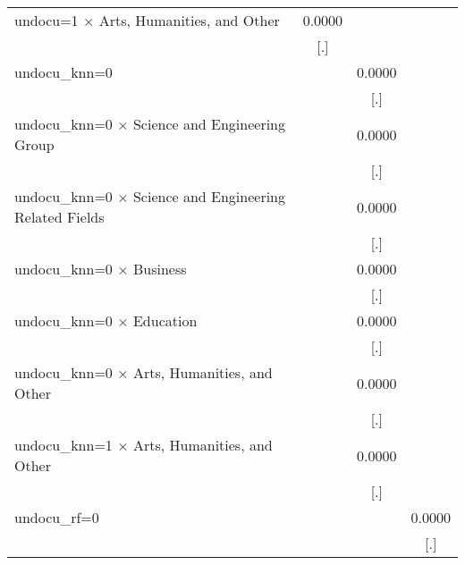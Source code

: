 \begin{table}[htbp]
\begin{tabular}{l*{3}{c}}
\addlinespace
undocu=1 $\times$ Arts, Humanities, and Other&      0.0000         &                     &                     \\
                    &         [.]         &                     &                     \\
\addlinespace
undocu\_knn=0        &                     &      0.0000         &                     \\
                    &                     &         [.]         &                     \\
\addlinespace
undocu\_knn=0 $\times$ Science and Engineering Group&                     &      0.0000         &                     \\
                    &                     &         [.]         &                     \\
\addlinespace
undocu\_knn=0 $\times$ Science and Engineering Related Fields&                     &      0.0000         &                     \\
                    &                     &         [.]         &                     \\
\addlinespace
undocu\_knn=0 $\times$ Business&                     &      0.0000         &                     \\
                    &                     &         [.]         &                     \\
\addlinespace
undocu\_knn=0 $\times$ Education&                     &      0.0000         &                     \\
                    &                     &         [.]         &                     \\
\addlinespace
undocu\_knn=0 $\times$ Arts, Humanities, and Other&                     &      0.0000         &                     \\
                    &                     &         [.]         &                     \\
\addlinespace
undocu\_knn=1 $\times$ Arts, Humanities, and Other&                     &      0.0000         &                     \\
                    &                     &         [.]         &                     \\
\addlinespace
undocu\_rf=0         &                     &                     &      0.0000         \\
                    &                     &                     &         [.]         \\

\end{tabular}
\end{table}
